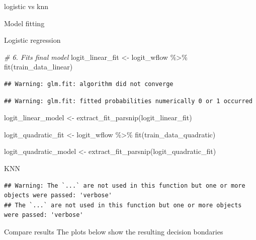 \documentclass[
  ignorenonframetext,
]{article}
\newenvironment{Shaded}{\begin{snugshade}}{\end{snugshade}}
\newcommand{\CommentTok}[1]{\textcolor[rgb]{0.56,0.35,0.01}{\textit{#1}}}
\newcommand{\FunctionTok}[1]{\textcolor[rgb]{0.00,0.00,0.00}{#1}}
\newcommand{\NormalTok}[1]{#1}
\newcommand{\OtherTok}[1]{\textcolor[rgb]{0.56,0.35,0.01}{#1}}
\newcommand{\SpecialCharTok}[1]{\textcolor[rgb]{0.00,0.00,0.00}{#1}}
\begin{document}
\begin{frame}[fragile]{logistic vs knn}
\begin{block}{Model fitting}
\begin{block}{Logistic regression}
\begin{Shaded}
\begin{Highlighting}[]
\CommentTok{\# 6. Fits final model}
\NormalTok{logit\_linear\_fit }\OtherTok{\textless{}{-}} 
\NormalTok{  logit\_wflow }\SpecialCharTok{\%\textgreater{}\%} 
  \FunctionTok{fit}\NormalTok{(train\_data\_linear)}
\end{Highlighting}
\end{Shaded}

\begin{verbatim}
## Warning: glm.fit: algorithm did not converge
\end{verbatim}

\begin{verbatim}
## Warning: glm.fit: fitted probabilities numerically 0 or 1 occurred
\end{verbatim}

\begin{Shaded}
\begin{Highlighting}[]
\NormalTok{logit\_linear\_model }\OtherTok{\textless{}{-}} \FunctionTok{extract\_fit\_parsnip}\NormalTok{(logit\_linear\_fit)}

\NormalTok{logit\_quadratic\_fit }\OtherTok{\textless{}{-}} 
\NormalTok{  logit\_wflow }\SpecialCharTok{\%\textgreater{}\%} 
  \FunctionTok{fit}\NormalTok{(train\_data\_quadratic)}

\NormalTok{logit\_quadratic\_model }\OtherTok{\textless{}{-}} \FunctionTok{extract\_fit\_parsnip}\NormalTok{(logit\_quadratic\_fit)}
\end{Highlighting}
\end{Shaded}
\end{block}

\begin{block}{KNN}
\protect\hypertarget{knn}{}
\begin{verbatim}
## Warning: The `...` are not used in this function but one or more objects were passed: 'verbose'
## The `...` are not used in this function but one or more objects were passed: 'verbose'
\end{verbatim}
\end{block}
\end{block}

\begin{block}{Compare results}
\protect\hypertarget{compare-results}{}
The plots below show the resulting decision bondaries


\end{block}
\end{frame}
\end{document}
